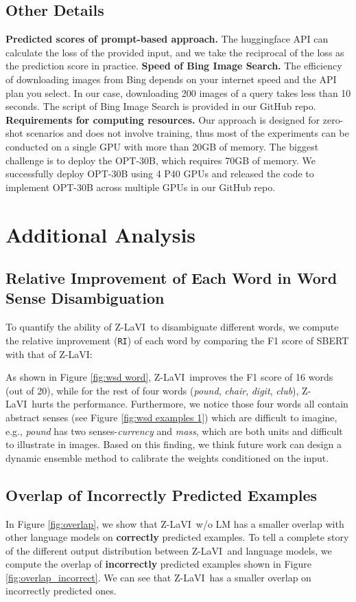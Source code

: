 \documentclass[11pt]{article}
\newcommand{\model}{Z-LaVI}
\begin{document}
\subsection{Other Details}
\textbf{Predicted scores of prompt-based approach.} The huggingface API can calculate the loss of the provided input, and we take the reciprocal of the loss as the prediction score in practice.
\medbreak
\noindent \textbf{Speed of Bing Image Search.} The efficiency of downloading images from Bing depends on your internet speed and the API plan you select. In our case, downloading 200 images of a query takes less than 10 seconds. The script of Bing Image Search is provided in our GitHub repo.
\medbreak
\noindent \textbf{Requirements for computing resources.} Our approach is designed for zero-shot scenarios and does not involve training, thus most of the experiments can be conducted on a single GPU with more than 20GB of memory. The biggest challenge is to deploy the OPT-30B, which requires 70GB of memory. We successfully deploy OPT-30B using 4 P40 GPUs and released the code to implement OPT-30B across multiple GPUs in our GitHub repo.

\section{Additional Analysis}
\subsection{Relative Improvement of Each Word in Word Sense Disambiguation}
To quantify the ability of \model~to disambiguate different words, we compute the relative improvement (\texttt{RI}) of each word by comparing the F1 score of SBERT with that of \model:



As shown in Figure \ref{fig:wsd word}, \model~improves the F1 score of 16 words (out of 20), while for the rest of four words (\textit{pound}, \textit{chair}, \textit{digit}, \textit{club}), \model~hurts the performance. Furthermore, we notice those four words all contain abstract senses (see Figure \ref{fig:wsd examples 1}) which are difficult to imagine, e.g., \textit{pound} has two senses-\textit{currency} and \textit{mass}, which are both units and difficult to illustrate in images. Based on this finding, we think future work can design a dynamic ensemble method to calibrate the weights conditioned on the input.

\subsection{Overlap of Incorrectly Predicted Examples}
In Figure \ref{fig:overlap}, we show that \model~w/o LM has a smaller overlap with other language models on \textbf{correctly} predicted examples. To tell a complete story of the different output distribution between \model~and language models, we compute the overlap of \textbf{incorrectly} predicted examples shown in Figure \ref{fig:overlap_incorrect}. We can see that \model~has a smaller overlap on incorrectly predicted ones.
\end{document}

